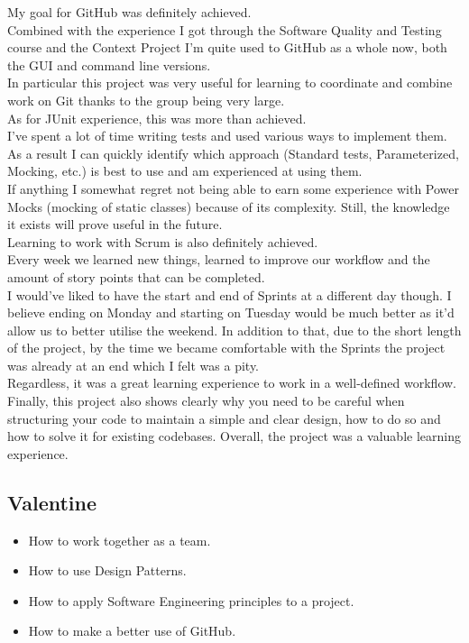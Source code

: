 \documentclass{article}
\begin{document}
\begin{enumerate}
\begin{itemize}
My goal for GitHub was definitely achieved. \\
Combined with the experience I got through the Software Quality and Testing course and the Context Project I'm quite used to GitHub as a whole now, both the GUI and command line versions.\\
In particular this project was very useful for learning to coordinate and combine work on Git thanks to the group being very large. \\

As for JUnit experience, this was more than achieved. \\
I've spent a lot of time writing tests and used various ways to implement them. As a result I can quickly identify which approach (Standard tests, Parameterized, Mocking, etc.) is best to use and am experienced at using them. \\
If anything I somewhat regret not being able to earn some experience with Power Mocks (mocking of static classes) because of its complexity. Still, the knowledge it exists will prove useful in the future. \\

Learning to work with Scrum is also definitely achieved. \\
Every week we learned new things, learned to improve our workflow and the amount of story points that can be completed. \\
I would've liked to have the start and end of Sprints at a different day though. I believe ending on Monday and starting on Tuesday would be much better as it'd allow us to better utilise the weekend.
In addition to that, due to the short length of the project, by the time we became comfortable with the Sprints the project was already at an end which I felt was a pity. \\
Regardless, it was a great learning experience to work in a well-defined workflow. \\

Finally, this project also shows clearly why you need to be careful when structuring your code to maintain a simple and clear design, how to do so and how to solve it for existing codebases. Overall, the project was a valuable learning experience.

\subsection*{Valentine}
\begin{itemize}
	\item How to work together as a team.
	\item How to use Design Patterns.
	\item How to apply Software Engineering principles to a project.
	\item How to make a better use of GitHub.
\end{itemize}


\end{itemize}
\end{enumerate}
\end{document}
